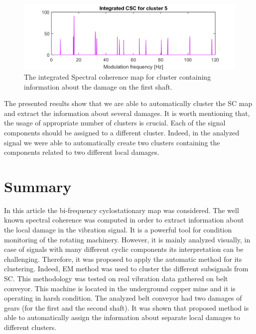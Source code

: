 \documentclass[11pt]{article}
\begin{document}
\begin{figure}[h!]
\begin{center}
\includegraphics[width=\textwidth]{wykresy/212_cluster_sum_5.png}
\caption{The integrated Spectral coherence map for cluster containing information about the damage on the first shaft.}
\label{fig:intSC5}
\end{center}
\end{figure}

The presented results show that we are able to automatically cluster the SC map and extract the information about several damages. It is worth mentioning that, the usage of appropriate number of clusters is crucial. Each of the signal components should be assigned to a different cluster. Indeed, in the analyzed signal we were able to automatically create two clusters containing the components related to two different local damages. 
\newpage
\section{Summary}
In this article the bi-frequency cyclostationary map was considered. The well known spectral coherence was computed in order to extract information about the local damage in the vibration signal. It is a powerful tool for condition monitoring of the rotating machinery. However, it is mainly analyzed visually, in case of signals with many different cyclic components its interpretation can be challenging. Therefore, it was proposed to apply the automatic method for its clustering. Indeed, EM method was used to cluster the different subsignals from SC. This methodology was tested on real vibration data gathered on belt conveyor. This machine is located in the underground copper mine and it is operating in harsh condition. The analyzed belt conveyor had two damages of  gears (for the first and the second shaft). It was shown that proposed method is able to automatically assign the information about separate local damages to different clusters. 

\end{document}
